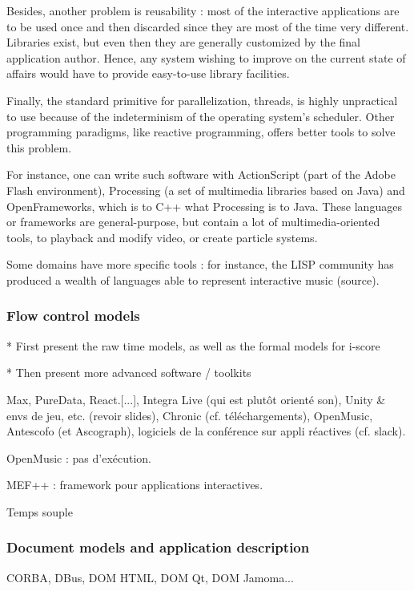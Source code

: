 \documentclass{sigchi}
\begin{document}
Besides, another problem is reusability : most of the interactive applications are to be used once and then discarded since they are most of the time very different. Libraries exist, but even then they are generally customized by the final application author. Hence, any system wishing to improve on the current state of affairs would have to provide easy-to-use library facilities.

Finally, the standard primitive for parallelization, threads, is highly unpractical to use because of the indeterminism of the operating system's scheduler. Other programming paradigms, like reactive programming, offers better tools to solve this problem.

For instance, one can write such software with ActionScript (part of the Adobe Flash environment), Processing (a set of multimedia libraries based on Java) and OpenFrameworks, which is to C++ what Processing is to Java\cite{noble2009programming}. These languages or frameworks are general-purpose, but contain a lot of multimedia-oriented tools, to playback and modify video, or create particle systems. 

Some domains have more specific tools : for instance, the LISP community has produced a wealth of languages able to represent interactive music (source).


\subsubsection{Flow control models}

* First present the raw time models, as well as the formal models for i-score

* Then present more advanced software / toolkits


Max, PureData, React.[...], Integra Live (qui est plutôt orienté son), Unity \& envs de jeu, etc. (revoir slides), Chronic (cf. téléchargements), OpenMusic, Antescofo (et Ascograph), logiciels de la conférence sur appli réactives (cf. slack).

OpenMusic : pas d'exécution.

MEF++\cite{ackermann_direct_1994} : framework pour applications interactives.

Temps souple\cite{song_interactive_1999}


\subsubsection{Document models and application description} %
CORBA, DBus, DOM HTML, DOM Qt, DOM Jamoma...
\end{document}

